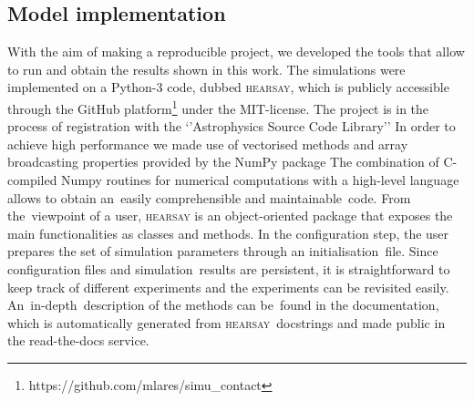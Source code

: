 \documentclass[crop]{CSLB}
\newcommand{\hs}{\textsc{hearsay}}
\begin{document}
\subsection{Model implementation}


%
With the aim of making a reproducible project, we developed the tools
that allow to run and obtain the results shown in this work.
%
The simulations were implemented on a Python-3 code, dubbed \hs{},
which is publicly accessible through the GitHub
platform\footnote{https://github.com/mlares/simu\_contact} under the
MIT-license.
%
The project is in the process of registration with the ‘’Astrophysics
Source Code Library’’ \citep[ASCL, ][]{2015JORS....3E..15A,
2020ASPC..522..731A}
%
In order to achieve high performance we made use of vectorised methods
and array broadcasting properties provided by the NumPy package
\citep{oliphant_numpy_2006, vanderwalt_numpy_2011}
%
The combination of C-compiled Numpy routines for numerical
computations with a high-level language allows to obtain an easily
comprehensible and maintainable code.
%
From the viewpoint of a user, \hs{} is an object-oriented package that
exposes the main functionalities as classes and methods.
%
In the configuration step, the user prepares the set of simulation
parameters through an initialisation file.
%
Since configuration files and simulation results are persistent, it is
straightforward to keep track of different experiments and the
experiments can be revisited easily.
%
An in-depth description of the methods can be found in the
documentation, which is automatically generated from \hs{} docstrings
and made public in the read-the-docs service.
\end{document}
